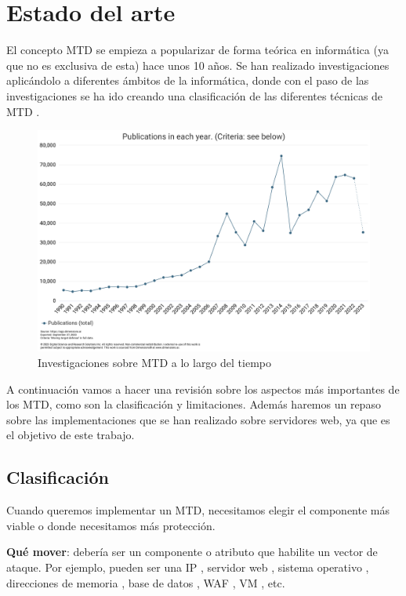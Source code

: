 \chapter{Estado del arte}

El concepto MTD se empieza a popularizar de forma teórica en informática (ya que no es exclusiva de esta) hace unos 10 años. Se han realizado investigaciones aplicándolo a diferentes ámbitos de la informática, donde con el paso de las investigaciones se ha ido creando una clasificación de las diferentes técnicas de MTD \cite{big-state-of-art}.
\begin{figure}[h]
    \centering
    \includegraphics[width=\linewidth]{./imagenes/busquedasMTD.png}
    \caption{Investigaciones sobre MTD a lo largo del tiempo}
\end{figure}

A continuación vamos a hacer una revisión sobre los aspectos más importantes de los MTD, como son la clasificación y limitaciones. Además haremos un repaso sobre las implementaciones que se han realizado sobre servidores web, ya que es el objetivo de este trabajo.

\section{Clasificación}
Cuando queremos implementar un MTD, necesitamos elegir el componente más viable o donde necesitamos más protección.

\textbf{Qué mover}: debería ser un componente o atributo que habilite un vector de ataque. Por ejemplo, pueden ser una IP \cite{MTD-SDN+decoy}\cite{MTD-ipshuffling+honeypots}\cite{MTD-POC-empresa}, servidor web \cite{MTD-DARE}\cite{MTD-MORE+DARE+Java}, sistema operativo \cite{MTD-MORE+DARE+Java}, direcciones de memoria \cite{MTD-ASR}, base de datos \cite{MTD-arab}, WAF \cite{MTD-WAF}, VM \cite{MTD-POC-empresa}\cite{MTD-DARE}\cite{SCIT-base}, etc.


